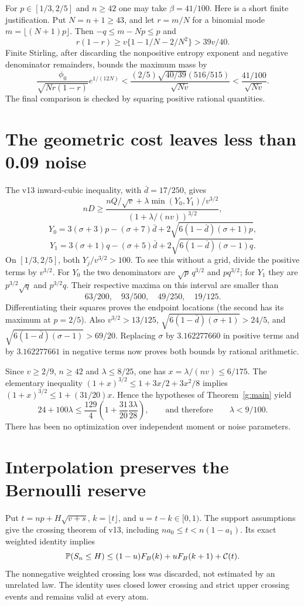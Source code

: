 \documentclass[11pt]{article}
\begin{document}
For $p\in[1/3,2/5]$ and $n\ge42$ one may take $\beta=41/100$.
Here is a short finite justification. Put $N=n+1\ge43$, and let $r=m/N$
for a binomial mode $m=\lfloor(N+1)p\rfloor$. Then
$-q\le m-Np\le p$ and
\[
 r(1-r)\ge v\{1-1/N-2/N^2\}>39v/40.
\]
Finite Stirling, after discarding the nonpositive entropy exponent and
negative denominator remainders, bounds the maximum mass by
\[
 \frac{\phi_0}{\sqrt{Nr(1-r)}}e^{1/(12N)}
 <\frac{(2/5)\sqrt{40/39}(516/515)}{\sqrt{Nv}}
 <\frac{41/100}{\sqrt{Nv}}.
\]
The final comparison is checked by squaring positive rational quantities.

\section{The geometric cost leaves less than 0.09 noise}
The v13 inward-cubic inequality, with $\bar d=17/250$, gives
\[
 nD\ge\frac{nQ/\sqrt v+
           \lambda\min(Y_0,Y_1)/v^{3/2}}
                {(1+\lambda/(nv))^{3/2}},
\]
\[
 Y_0=3(\sigma+3)p-(\sigma+7)\bar d
                   +2\sqrt{6(1-\bar d)(\sigma+1)p},
\]
\[
 Y_1=3(\sigma+1)q-(\sigma+5)\bar d
                   +2\sqrt{6(1-\bar d)(\sigma-1)q}.
\]
On $[1/3,2/5]$, both $Y_j/v^{3/2}>100$. To see this without a grid,
divide the positive terms by $v^{3/2}$. For $Y_0$ the two denominators
are $\sqrt p\,q^{3/2}$ and $p q^{3/2}$; for $Y_1$ they are
$p^{3/2}\sqrt q$ and $p^{3/2}q$. Their respective maxima on this interval
are smaller than
\[
                         63/200,\quad93/500,\quad49/250,\quad19/125.
\]
Differentiating their squares proves the endpoint locations (the second
has its maximum at $p=2/5$). Also $v^{3/2}>13/125$,
$\sqrt{6(1-\bar d)(\sigma+1)}>24/5$, and
$\sqrt{6(1-\bar d)(\sigma-1)}>69/20$.
Replacing $\sigma$ by $3.162277660$ in positive terms and by
$3.162277661$ in negative terms now proves both bounds by rational arithmetic.

Since $v\ge2/9$, $n\ge42$ and $\lambda\le8/25$, one has
$x=\lambda/(nv)\le6/175$. The elementary inequality
$(1+x)^{3/2}\le1+3x/2+3x^2/8$ implies
$(1+x)^{3/2}\le1+(31/20)x$. Hence the hypotheses of Theorem~\ref{g:main}
yield
\[
 24+100\lambda\le\frac{129}{4}
               \left(1+\frac{31}{20}\frac{3\lambda}{28}\right),
 \qquad\text{and therefore}\qquad\lambda<9/100.
\]
There has been no optimization over independent moment or noise parameters.

\section{Interpolation preserves the Bernoulli reserve}
Put $t=np+H\sqrt{v+s}$, $k=\lfloor t\rfloor$, and $u=t-k\in[0,1)$.
The support assumptions give the crossing theorem of v13, including
$na_0\le t<n(1-a_1)$. Its exact weighted identity implies
\begin{equation}\label{g:cross}
 \mathbb P(S_n\le H)\le(1-u)F_B(k)+uF_B(k+1)+\mathcal C(t).
\end{equation}
The nonnegative weighted crossing loss was discarded, not estimated by
an unrelated law. The identity uses closed lower crossing and strict upper
crossing events and remains valid at every atom.
\end{document}
